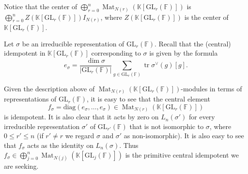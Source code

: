 \documentclass[12pt, reqno]{amsart}
\theoremstyle{definition}
\newcommand{\coefficientsField}{\mathbb{K}}
\newcommand{\sizeof}[1]{\left|#1\right|}
\newcommand{\IdentityMatrix}[1]{I_{#1}}
\newcommand{\diag}{\mathrm{diag}}
\newcommand{\trace}{\operatorname{tr}}
\newcommand{\GL}{\mathrm{GL}}
\newcommand{\finiteField}{\mathbb{F}}
\newcommand{\squareMatrix}{\operatorname{Mat}}
\begin{document}
	Notice that the center of $\bigoplus_{r=0}^n \squareMatrix_{N\left(r\right)}\left(\coefficientsField\left[\GL_r\left(\finiteField\right)\right]\right)$ is $\bigoplus_{r=0}^n Z\left(\coefficientsField\left[\GL_r\left(\finiteField\right)\right]\right) \IdentityMatrix{N\left(r\right)}$, where $Z\left(\coefficientsField\left[\GL_r\left(\finiteField\right)\right]\right)$ is the center of $\coefficientsField\left[\GL_r\left(\finiteField\right)\right]$.
	
	Let $\sigma$ be an irreducible representation of $\GL_r\left(\finiteField\right)$. Recall that the (central) idempotent in $\coefficientsField\left[\GL_r\left(\finiteField\right)\right]$ corresponding to $\sigma$ is given by the formula
	\begin{equation}\label{eq:idempotent-for-irreducible-representation-of-group}
		e_{\sigma} = \frac{\dim \sigma}{\sizeof{\GL_r\left(\finiteField\right)}} \sum_{g \in \GL_r\left(\finiteField\right)} \trace \sigma^{\vee}\left(g\right) \left[g\right].
	\end{equation}
	
	Given the description above of $\squareMatrix_{N\left(r\right)}\left(\coefficientsField\left[\GL_r\left(\finiteField\right)\right]\right)$-modules in terms of representations of $\GL_r\left(\finiteField\right)$, it is easy to see that the central element
	\begin{displaymath}
	f_{\sigma} = \diag\left(e_{\sigma},\dots,e_{\sigma}\right) \in \squareMatrix_{N\left(r\right)}\left(\coefficientsField\left[\GL_r\left(\finiteField\right)\right]\right)
	\end{displaymath}
	is idempotent. It is also clear that it acts by zero on $L_n\left(\sigma'\right)$ for every irreducible representation $\sigma'$ of $\GL_{r'}\left(\finiteField\right)$ that is not isomorphic to $\sigma$, where $0 \le r' \le n$ (if $r' \ne r$ we regard $\sigma$ and $\sigma'$ as non-isomorphic). It is also easy to see that $f_{\sigma}$ acts as the identity on $L_n\left(\sigma\right)$. Thus $f_{\sigma} \in \bigoplus_{j=0}^n \squareMatrix_{N\left(j\right)}\left(\coefficientsField\left[\GL_j\left(\finiteField\right)\right]\right)$ is the primitive central idempotent we are seeking.
	
\end{document}
